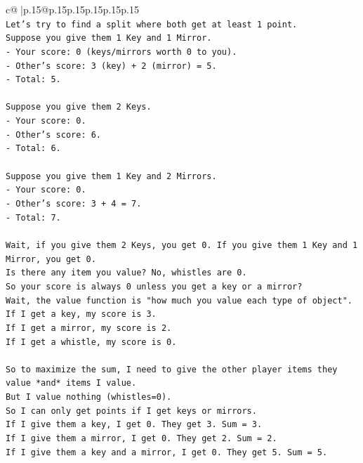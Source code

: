 \documentclass{article}
\begin{document}
{\begin{supertabular}{c@{$\;$}|p{.15\linewidth}@{}p{.15\linewidth}p{.15\linewidth}p{.15\linewidth}p{.15\linewidth}p{.15\linewidth}}
{{{\\ 
\texttt{Let's try to find a split where both get at least 1 point.} \\
\texttt{Suppose you give them 1 Key and 1 Mirror.} \\
\texttt{{-} Your score: 0 (keys/mirrors worth 0 to you).} \\
\texttt{{-} Other's score: 3 (key) + 2 (mirror) = 5.} \\
\texttt{{-} Total: 5.} \\
\\ 
\texttt{Suppose you give them 2 Keys.} \\
\texttt{{-} Your score: 0.} \\
\texttt{{-} Other's score: 6.} \\
\texttt{{-} Total: 6.} \\
\\ 
\texttt{Suppose you give them 1 Key and 2 Mirrors.} \\
\texttt{{-} Your score: 0.} \\
\texttt{{-} Other's score: 3 + 4 = 7.} \\
\texttt{{-} Total: 7.} \\
\\ 
\texttt{Wait, if you give them 2 Keys, you get 0. If you give them 1 Key and 1 Mirror, you get 0.} \\
\texttt{Is there any item you value? No, whistles are 0.} \\
\texttt{So your score is always 0 unless you get a key or a mirror?} \\
\texttt{Wait, the value function is "how much you value each type of object".} \\
\texttt{If I get a key, my score is 3.} \\
\texttt{If I get a mirror, my score is 2.} \\
\texttt{If I get a whistle, my score is 0.} \\
\\ 
\texttt{So to maximize the sum, I need to give the other player items they value *and* items I value.} \\
\texttt{But I value nothing (whistles=0).} \\
\texttt{So I can only get points if I get keys or mirrors.} \\
\texttt{If I give them a key, I get 0. They get 3. Sum = 3.} \\
\texttt{If I give them a mirror, I get 0. They get 2. Sum = 2.} \\
\texttt{If I give them a key and a mirror, I get 0. They get 5. Sum = 5.} \\
}}}
\end{supertabular}}
\end{document}
